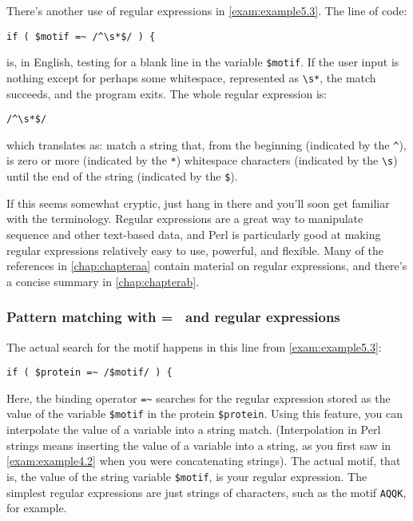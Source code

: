 There's another use of regular expressions in \autoref{exam:example5.3}. The line of code: 

\begin{lstlisting}
if ( $motif =~ /^\s*$/ ) {
\end{lstlisting}

is, in English, testing for a blank line in the variable \verb|$motif|. If the user input is nothing except for perhaps some whitespace, represented as \verb|\s*|, the match succeeds, and the program exits. The whole regular expression is: 

\begin{lstlisting}
/^\s*$/
\end{lstlisting}

which translates as: match a string that, from the beginning (indicated by the \verb|^|), is zero or more (indicated by the \verb|*|) whitespace characters (indicated by the \verb|\s|) until the end of the string (indicated by the \verb|$|).

If this seems somewhat cryptic, just hang in there and you'll soon get familiar with the terminology. Regular expressions are a great way to manipulate sequence and other text-based data, and Perl is particularly good at making regular expressions relatively easy to use, powerful, and flexible. Many of the references in \autoref{chap:chapteraa} contain material on regular expressions, and there's a concise summary in \autoref{chap:chapterab}.

\subsubsection{Pattern matching with =~ and regular expressions}
The actual search for the motif happens in this line from \autoref{exam:example5.3}: 

\begin{lstlisting}
if ( $protein =~ /$motif/ ) {
\end{lstlisting}

Here, the binding operator \verb|=~| searches for the regular expression stored as the value of the variable \verb|$motif| in the protein \verb|$protein|. Using this feature, you can interpolate the value of a variable into a string match. (Interpolation in Perl strings means inserting the value of a variable into a string, as you first saw in \autoref{exam:example4.2} when you were concatenating strings). The actual motif, that is, the value of the string variable \verb|$motif|, is your regular expression. The simplest regular expressions are just strings of characters, such as the motif \verb|AQQK|, for example.

